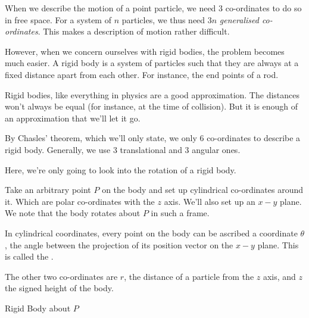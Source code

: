 When we describe the motion of a point particle, we need \(3\) co-ordinates 
to do so in free space. For a system of \(n\) particles, we thus need
\(3n\) \emph{generalised co-ordinates}. This makes a description of motion
rather difficult.

However, when we concern ourselves with rigid bodies, the problem becomes
much easier. A rigid body is a system of particles such that they are 
always at a fixed distance apart from each other. For instance, 
the end points of a rod.

Rigid bodies, like everything in physics are a good approximation. 
The distances won't always be equal (for instance, at the time of collision).
But it is enough of an approximation that we'll let it go.

By Chasles' theorem, which we'll only state, we only \(6\) co-ordinates to 
describe a rigid body. Generally, we use \(3\) translational and \(3\) angular
ones.

Here, we're only going to look into the rotation of a rigid body.

Take an arbitrary point \(P\) on the body and set up cylindrical co-ordinates around it.
Which are polar co-ordinates with the \(z\) axis. We'll also set up an \(x-y\)
plane.
We note that the body rotates about \(P\) in such a frame.


In cylindrical coordinates, every point on the body can be ascribed a
coordinate \(\theta\), the angle between the projection of its position vector on the 
\(x-y\) plane. This is called the .

The other two co-ordinates are \(r\), the distance of a particle from the 
\(z\) axis, and \(z\) the signed height of the body.

\begin{marginfigure}
    \centering
    \caption{Rigid Body about \(P\)}
\end{marginfigure}


